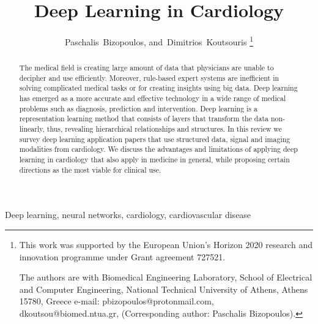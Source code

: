 \documentclass[journal]{IEEEtran}
\begin{document}
\title{Deep Learning in Cardiology}
\author{Paschalis~Bizopoulos, and~Dimitrios~Koutsouris
\thanks{This work was supported by the European Union's Horizon 2020 research and innovation programme under Grant agreement 727521. 

The authors are with Biomedical Engineering Laboratory, School of Electrical and Computer Engineering, National Technical University of Athens, Athens 15780, Greece e-mail: pbizopoulos@protonmail.com, dkoutsou@biomed.ntua.gr, (Corresponding author: Paschalis Bizopoulos).}}

\IEEEoverridecommandlockouts
{}
\maketitle
\IEEEpubidadjcol

\begin{abstract}
	The medical field is creating large amount of data that physicians are unable to decipher and use efficiently.
	Moreover, rule-based expert systems are inefficient in solving complicated medical tasks or for creating insights using big data.
	Deep learning has emerged as a more accurate and effective technology in a wide range of medical problems such as diagnosis, prediction and intervention.
	Deep learning is a representation learning method that consists of layers that transform the data non-linearly, thus, revealing hierarchical relationships and structures.
	In this review we survey deep learning application papers that use structured data, signal and imaging modalities from cardiology.
	We discuss the advantages and limitations of applying deep learning in cardiology that also apply in medicine in general, while proposing certain directions as the most viable for clinical use.
\end{abstract}

\begin{IEEEkeywords}
	Deep learning, neural networks, cardiology, cardiovascular disease
\end{IEEEkeywords}
\end{document}
